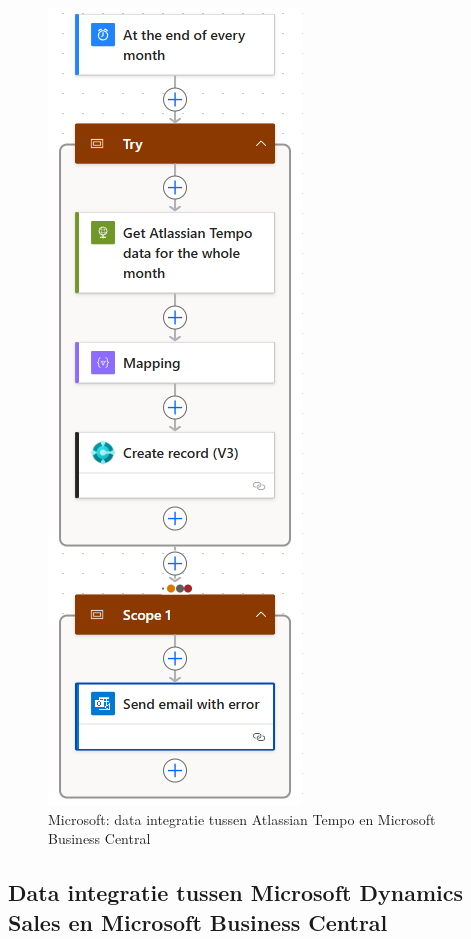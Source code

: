 \begin{figure}[H]
    \centering
    \includegraphics[]{../bachproef/images/Microsoft_AtlassianTime.png}
    \caption{Microsoft: data integratie tussen Atlassian Tempo en Microsoft Business Central}
\end{figure}

\subsection{Data integratie tussen Microsoft Dynamics Sales en Microsoft Business Central}
\label{ch:Microsoft2}

